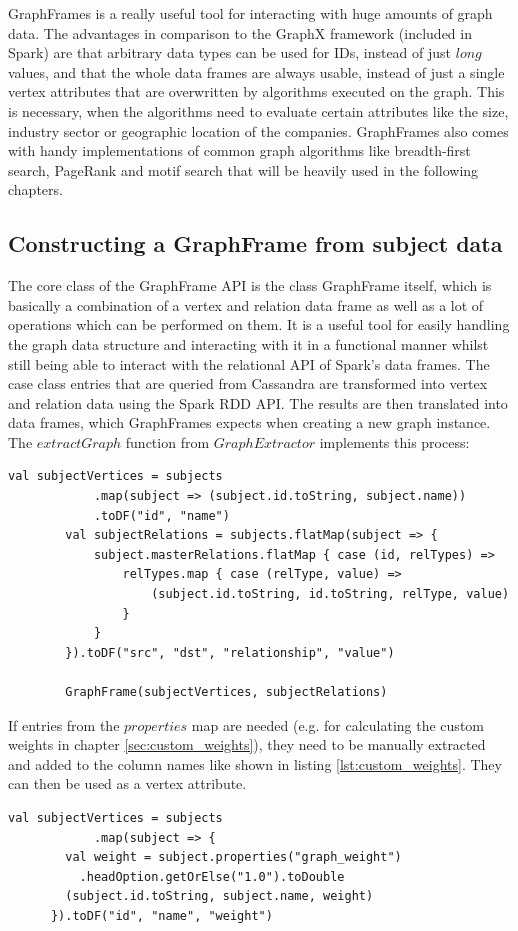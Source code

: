 \documentclass[
        a4paper,     %
        titlepage,   %
        oneside,     %
        parskip      %
]{scrartcl}          %
\begin{document}
    GraphFrames is a really useful tool for interacting with huge amounts of graph
    data. The advantages in comparison to the GraphX framework (included in Spark) are that arbitrary data types
    can be used for IDs, instead of just $long$ values, and that the whole data frames
    are always usable, instead of just a single vertex attributes that are overwritten
    by algorithms executed on the graph. This is necessary, when the algorithms need to
    evaluate certain attributes like the size, industry sector or geographic location of the companies.
    GraphFrames also comes with handy implementations
    of common graph algorithms like breadth-first search, PageRank and motif search
    that will be heavily used in the following chapters.

    \subsection{Constructing a GraphFrame from subject data}
    \label{sec:graphframe_construction}
    The core class of the GraphFrame API is the class GraphFrame itself, which
    is basically a combination of a vertex and relation data frame as well as a
    lot of operations which can be performed on them. It is a useful tool for
    easily handling the graph data structure and interacting with it in a functional
    manner whilst still being able to interact with the relational API of Spark's data frames.
    The case class entries that are queried from Cassandra are transformed into vertex
    and relation data using the Spark RDD API. The results are then translated into
    data frames, which GraphFrames expects when creating a new graph instance.\\
    The $extractGraph$ function from $GraphExtractor$ implements this process:

    \begin{lstlisting}[style=scalaStyle,caption=extractGraph in $GraphExtractor$]
		val subjectVertices = subjects
			.map(subject => (subject.id.toString, subject.name))
			.toDF("id", "name")
		val subjectRelations = subjects.flatMap(subject => {
			subject.masterRelations.flatMap { case (id, relTypes) =>
				relTypes.map { case (relType, value) =>
					(subject.id.toString, id.toString, relType, value)
				}
			}
		}).toDF("src", "dst", "relationship", "value")

		GraphFrame(subjectVertices, subjectRelations)
    \end{lstlisting}

    If entries from the $properties$ map are needed (e.g. for calculating the custom weights in
    chapter \ref{sec:custom_weights}), they need to be manually extracted
    and added to the column names like shown in listing \ref{lst:custom_weights}.
    They can then be used as a vertex attribute.
    \begin{lstlisting}[style=scalaStyle,caption=Custom weight extraction,label=lst:custom_weights]
		val subjectVertices = subjects
			.map(subject => {
        val weight = subject.properties("graph_weight")
          .headOption.getOrElse("1.0").toDouble
        (subject.id.toString, subject.name, weight)
      }).toDF("id", "name", "weight")
    \end{lstlisting}
\end{document}
